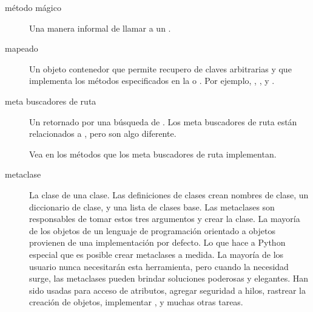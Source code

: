 \documentclass[a4,10pt,spanish]{sphinxmanual}
\begin{document}
\begin{description}
\item[{método mágico\label{\detokenize{glossary:term-magic-method}}}] \leavevmode
{}\ignorespaces 
\sphinxAtStartPar
Una manera informal de llamar a un {\hyperref[\detokenize{glossary:term-special-method}]{}}.

\item[{mapeado\label{\detokenize{glossary:term-mapping}}}] \leavevmode
\sphinxAtStartPar
Un objeto contenedor que permite recupero de claves arbitrarias y que implementa los métodos especificados en la  o  .  Por ejemplo, , ,  y .

\item[{meta buscadores de ruta\label{\detokenize{glossary:term-meta-path-finder}}}] \leavevmode
\sphinxAtStartPar
Un {\hyperref[\detokenize{glossary:term-finder}]{}} retornado por una búsqueda de .  Los meta buscadores de ruta están relacionados a {\hyperref[\detokenize{glossary:term-path-entry-finder}]{}}, pero son algo diferente.

\sphinxAtStartPar
Vea en  los métodos que los meta buscadores de ruta implementan.

\item[{metaclase\label{\detokenize{glossary:term-metaclass}}}] \leavevmode
\sphinxAtStartPar
La clase de una clase.  Las definiciones de clases crean nombres de clase, un diccionario de clase, y una lista de clases base.  Las metaclases son responsables de tomar estos tres argumentos y crear la clase.  La mayoría de los objetos de un lenguaje de programación orientado a objetos provienen de una implementación por defecto.  Lo que hace a Python especial que es posible crear metaclases a medida.  La mayoría de los usuario nunca necesitarán esta herramienta, pero cuando la necesidad surge, las metaclases pueden brindar soluciones poderosas y elegantes.  Han sido usadas para  acceso de atributos, agregar seguridad a hilos, rastrear la creación de objetos, implementar , y muchas otras tareas.


\end{description}
\end{document}
